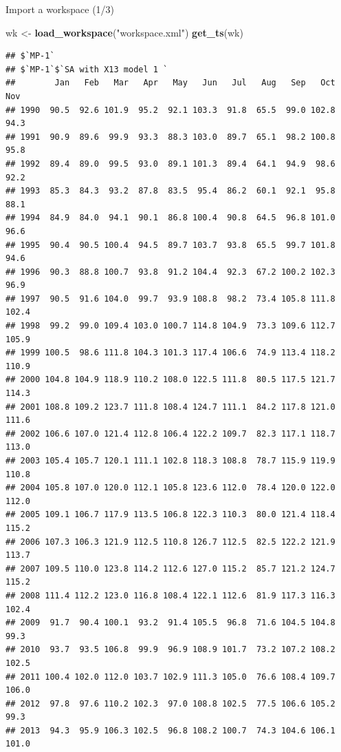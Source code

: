 \documentclass[10pt,xcolor=table,color={dvipsnames,usenames},ignorenonframetext,usepdftitle=false,french]{beamer}
\newenvironment{Shaded}{\begin{snugshade}}{\end{snugshade}}
\newcommand{\KeywordTok}[1]{\textcolor[rgb]{0.13,0.29,0.53}{\textbf{#1}}}
\newcommand{\NormalTok}[1]{#1}
\newcommand{\StringTok}[1]{\textcolor[rgb]{0.31,0.60,0.02}{#1}}
\begin{document}
\begin{frame}[fragile]{Import a workspace (1/3)}
\protect\hypertarget{import-a-workspace-13}{}

\footnotesize

\begin{Shaded}
\begin{Highlighting}[]
\NormalTok{wk <-}\StringTok{ }\KeywordTok{load_workspace}\NormalTok{(}\StringTok{"workspace.xml"}\NormalTok{)}
\KeywordTok{get_ts}\NormalTok{(wk)}
\end{Highlighting}
\end{Shaded}

\begin{verbatim}
## $`MP-1`
## $`MP-1`$`SA with X13 model 1 `
##        Jan   Feb   Mar   Apr   May   Jun   Jul   Aug   Sep   Oct   Nov
## 1990  90.5  92.6 101.9  95.2  92.1 103.3  91.8  65.5  99.0 102.8  94.3
## 1991  90.9  89.6  99.9  93.3  88.3 103.0  89.7  65.1  98.2 100.8  95.8
## 1992  89.4  89.0  99.5  93.0  89.1 101.3  89.4  64.1  94.9  98.6  92.2
## 1993  85.3  84.3  93.2  87.8  83.5  95.4  86.2  60.1  92.1  95.8  88.1
## 1994  84.9  84.0  94.1  90.1  86.8 100.4  90.8  64.5  96.8 101.0  96.6
## 1995  90.4  90.5 100.4  94.5  89.7 103.7  93.8  65.5  99.7 101.8  94.6
## 1996  90.3  88.8 100.7  93.8  91.2 104.4  92.3  67.2 100.2 102.3  96.9
## 1997  90.5  91.6 104.0  99.7  93.9 108.8  98.2  73.4 105.8 111.8 102.4
## 1998  99.2  99.0 109.4 103.0 100.7 114.8 104.9  73.3 109.6 112.7 105.9
## 1999 100.5  98.6 111.8 104.3 101.3 117.4 106.6  74.9 113.4 118.2 110.9
## 2000 104.8 104.9 118.9 110.2 108.0 122.5 111.8  80.5 117.5 121.7 114.3
## 2001 108.8 109.2 123.7 111.8 108.4 124.7 111.1  84.2 117.8 121.0 111.6
## 2002 106.6 107.0 121.4 112.8 106.4 122.2 109.7  82.3 117.1 118.7 113.0
## 2003 105.4 105.7 120.1 111.1 102.8 118.3 108.8  78.7 115.9 119.9 110.8
## 2004 105.8 107.0 120.0 112.1 105.8 123.6 112.0  78.4 120.0 122.0 112.0
## 2005 109.1 106.7 117.9 113.5 106.8 122.3 110.3  80.0 121.4 118.4 115.2
## 2006 107.3 106.3 121.9 112.5 110.8 126.7 112.5  82.5 122.2 121.9 113.7
## 2007 109.5 110.0 123.8 114.2 112.6 127.0 115.2  85.7 121.2 124.7 115.2
## 2008 111.4 112.2 123.0 116.8 108.4 122.1 112.6  81.9 117.3 116.3 102.4
## 2009  91.7  90.4 100.1  93.2  91.4 105.5  96.8  71.6 104.5 104.8  99.3
## 2010  93.7  93.5 106.8  99.9  96.9 108.9 101.7  73.2 107.2 108.2 102.5
## 2011 100.4 102.0 112.0 103.7 102.9 111.3 105.0  76.6 108.4 109.7 106.0
## 2012  97.8  97.6 110.2 102.3  97.0 108.8 102.5  77.5 106.6 105.2  99.3
## 2013  94.3  95.9 106.3 102.5  96.8 108.2 100.7  74.3 104.6 106.1 101.0

\end{verbatim}
\end{frame}
\end{document}
